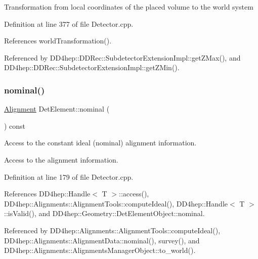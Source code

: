 Transformation from local coordinates of the placed volume to the world system 

Definition at line 377 of file Detector.\+cpp.



References world\+Transformation().



Referenced by D\+D4hep\+::\+D\+D\+Rec\+::\+Subdetector\+Extension\+Impl\+::get\+Z\+Max(), and D\+D4hep\+::\+D\+D\+Rec\+::\+Subdetector\+Extension\+Impl\+::get\+Z\+Min().

\hypertarget{class_d_d4hep_1_1_geometry_1_1_det_element_a6d05a465352cd296917cf7df8a2f3b5c}{}\label{class_d_d4hep_1_1_geometry_1_1_det_element_a6d05a465352cd296917cf7df8a2f3b5c} 
\subsubsection{\texorpdfstring{nominal()}{nominal()}}
{\footnotesize\ttfamily \hyperlink{class_d_d4hep_1_1_geometry_1_1_det_element_a5e5bddb6f1ba24c21af381b9bfeb3dba}{Alignment} Det\+Element\+::nominal (\begin{DoxyParamCaption}{ }\end{DoxyParamCaption}) const}



Access to the constant ideal (nominal) alignment information. 

Access to the alignment information. 

Definition at line 179 of file Detector.\+cpp.



References D\+D4hep\+::\+Handle$<$ T $>$\+::access(), D\+D4hep\+::\+Alignments\+::\+Alignment\+Tools\+::compute\+Ideal(), D\+D4hep\+::\+Handle$<$ T $>$\+::is\+Valid(), and D\+D4hep\+::\+Geometry\+::\+Det\+Element\+Object\+::nominal.



Referenced by D\+D4hep\+::\+Alignments\+::\+Alignment\+Tools\+::compute\+Ideal(), D\+D4hep\+::\+Alignments\+::\+Alignment\+Data\+::nominal(), survey(), and D\+D4hep\+::\+Alignments\+::\+Alignments\+Manager\+Object\+::to\+\_\+world().

\hypertarget{class_d_d4hep_1_1_geometry_1_1_det_element_ab8f9bd08591075ee3ebd58d21181e6e4}{}\label{class_d_d4hep_1_1_geometry_1_1_det_element_ab8f9bd08591075ee3ebd58d21181e6e4} 
